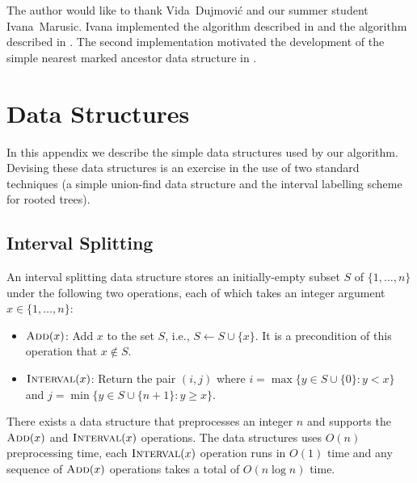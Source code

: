 \documentclass[kpfonts]{patmorin}
\let\ge\geqslant
\begin{document}
The author would like to thank Vida~Dujmović and our summer student \mbox{Ivana~Marusic}.  Ivana implemented the algorithm described in  and the algorithm described in .  The second implementation motivated the development of the simple nearest marked ancestor data structure in .






\appendix

\section{Data Structures}

In this appendix we describe the simple data structures used by our algorithm. Devising these data structures is an exercise in the use of two standard techniques (a simple union-find data structure and the interval labelling scheme for rooted trees).

\subsection{Interval Splitting}

An interval splitting data structure stores an initially-empty subset $S$ of $\{1,\ldots,n\}$ under the following two operations, each of which takes an integer argument $x\in\{1,\ldots,n\}$:
\begin{itemize}
    \item $\textsc{Add}(x)$: Add $x$ to the set $S$, i.e., $S\gets S\cup \{x\}$.  It is a precondition of this operation that $x\not\in S$.
    \item $\textsc{Interval}(x)$: Return the pair $(i,j)$ where $i=\max\{y\in S\cup\{0\}:y<x\}$ and $j=\min\{y\in S\cup\{n+1\}:y\ge x\}$.
\end{itemize}

\begin{lem}
    There exists a data structure that preprocesses an integer $n$ and supports the $\textsc{Add}(x)$ and $\textsc{Interval}(x)$ operations.  The data structures uses $O(n)$ preprocessing time, each $\textsc{Interval}(x)$ operation runs in $O(1)$ time and any sequence of $\textsc{Add}(x)$ operations takes a total of $O(n\log n)$ time.
\end{lem}
\end{document}

